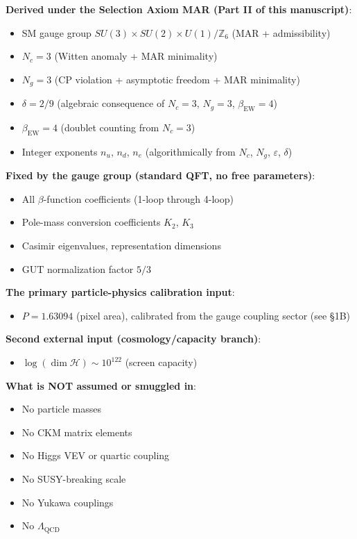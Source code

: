 \textbf{Derived under the Selection Axiom MAR (Part II of this manuscript)}:

\begin{itemize}
\tightlist
\item
  SM gauge group \(SU(3) \times SU(2) \times U(1)/\mathbb{Z}_6\) (MAR + admissibility)
\item
  \(N_c = 3\) (Witten anomaly + MAR minimality)
\item
  \(N_g = 3\) (CP violation + asymptotic freedom + MAR minimality)
\item
  \(\delta = 2/9\) (algebraic consequence of \(N_c = 3\), \(N_g = 3\), \(\beta_{\text{EW}} = 4\))
\item
  \(\beta_{\text{EW}} = 4\) (doublet counting from \(N_c = 3\))
\item
  Integer exponents \(n_u\), \(n_d\), \(n_e\) (algorithmically from \(N_c\), \(N_g\), \(\varepsilon\), \(\delta\))
\end{itemize}

\textbf{Fixed by the gauge group (standard QFT, no free parameters)}:

\begin{itemize}
\tightlist
\item
  All \(\beta\)-function coefficients (1-loop through 4-loop)
\item
  Pole-mass conversion coefficients \(K_2\), \(K_3\)
\item
  Casimir eigenvalues, representation dimensions
\item
  GUT normalization factor \(5/3\)
\end{itemize}

\textbf{The primary particle-physics calibration input}:

\begin{itemize}
\tightlist
\item
  \(P = 1.63094\) (pixel area), calibrated from the gauge coupling sector (see §1B)
\end{itemize}

\textbf{Second external input (cosmology/capacity branch)}:

\begin{itemize}
\tightlist
\item
  \(\log(\dim\mathcal{H}) \sim 10^{122}\) (screen capacity)
\end{itemize}

\textbf{What is NOT assumed or smuggled in}:

\begin{itemize}
\tightlist
\item
  No particle masses
\item
  No CKM matrix elements
\item
  No Higgs VEV or quartic coupling
\item
  No SUSY-breaking scale
\item
  No Yukawa couplings
\item
  No \(\Lambda_{\text{QCD}}\)
\end{itemize}

